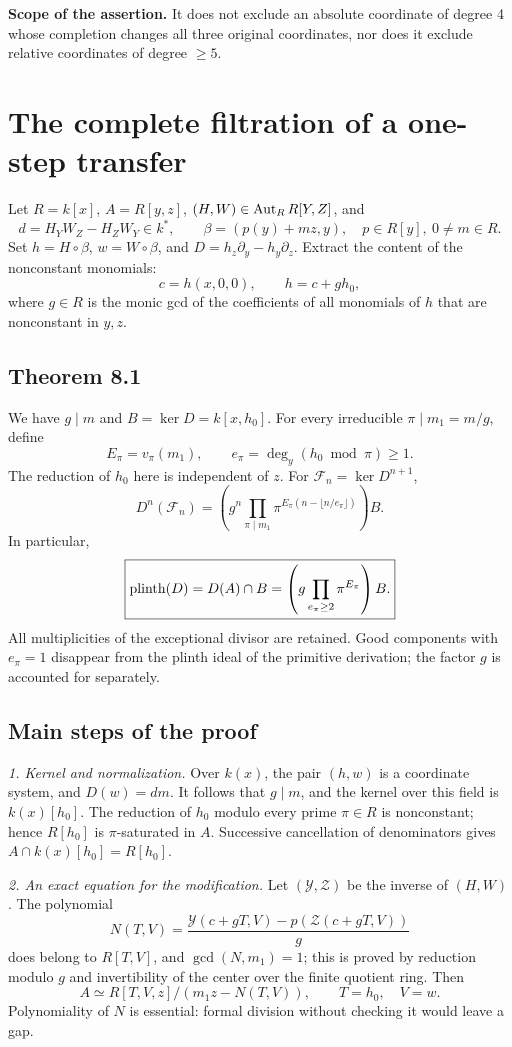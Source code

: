 \textbf{Scope of the assertion.} It does not exclude an absolute coordinate of degree 4 whose completion changes all three original coordinates, nor does it exclude relative coordinates of degree $\ge5$.

\section{The complete filtration of a one-step transfer}\label{sec:transfer}
Let $R=k[x]$, $A=R[y,z]$, $(H,W)\in\operatorname{Aut}_R R[Y,Z]$, and
\[
d=H_YW_Z-H_ZW_Y\in k^*,\qquad
\beta=(p(y)+mz,y),\quad p\in R[y],\ 0\ne m\in R.
\]
Set $h=H\circ\beta$, $w=W\circ\beta$, and $D=h_z\partial_y-h_y\partial_z$.
Extract the content of the nonconstant monomials:
\[
c=h(x,0,0),\qquad h=c+g h_0,
\]
where $g\in R$ is the monic gcd of the coefficients of all monomials of $h$ that are nonconstant in $y,z$.

\subsection*{Theorem 8.1}
We have $g\mid m$ and $B=\ker D=k[x,h_0]$. For every irreducible $\pi\mid m_1=m/g$, define
\[
E_\pi=v_\pi(m_1),\qquad e_\pi=\deg_y(h_0\bmod\pi)\ge1.
\]
The reduction of $h_0$ here is independent of $z$. For $\mathcal F_n=\ker D^{n+1}$,
\[
\boxed{D^n(\mathcal F_n)=
\left(g^n\prod_{\pi\mid m_1}\pi^{E_\pi(n-\lfloor n/e_\pi\rfloor)}\right)B.}
\]
In particular,
\[
\boxed{\operatorname{plinth}(D)=D(A)\cap B=
\left(g\prod_{e_\pi\ge2}\pi^{E_\pi}\right)B.}
\]
All multiplicities of the exceptional divisor are retained. Good components with $e_\pi=1$ disappear from the plinth ideal of the primitive derivation; the factor $g$ is accounted for separately.

\subsection*{Main steps of the proof}
\textit{1. Kernel and normalization.} Over $k(x)$, the pair $(h,w)$ is a coordinate system, and $D(w)=dm$. It follows that $g\mid m$, and the kernel over this field is $k(x)[h_0]$. The reduction of $h_0$ modulo every prime $\pi\in R$ is nonconstant; hence $R[h_0]$ is $\pi$-saturated in $A$. Successive cancellation of denominators gives $A\cap k(x)[h_0]=R[h_0]$.

\textit{2. An exact equation for the modification.} Let $(\mathcal Y,\mathcal Z)$ be the inverse of $(H,W)$. The polynomial
\[
N(T,V)=\frac{\mathcal Y(c+gT,V)-p(\mathcal Z(c+gT,V))}{g}
\]
does belong to $R[T,V]$, and $\gcd(N,m_1)=1$; this is proved by reduction modulo $g$ and invertibility of the center over the finite quotient ring. Then
\[
A\simeq R[T,V,z]/(m_1z-N(T,V)),\qquad T=h_0,\quad V=w.
\]
Polynomiality of $N$ is essential: formal division without checking it would leave a gap.

